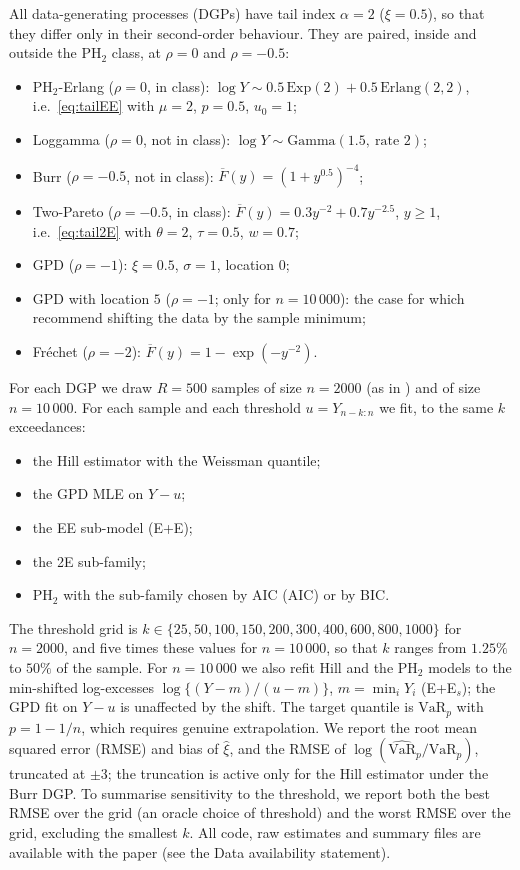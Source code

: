 \documentclass[12pt]{article}
\theoremstyle{definition}
\theoremstyle{remark}
\newcommand{\bF}{\overline{F}}
\newcommand{\VaR}{\mathrm{VaR}}
\begin{document}
All data-generating processes (DGPs) have tail index $\alpha=2$ ($\xi=0.5$), so that they differ only in their second-order behaviour. They are paired, inside and outside the PH$_2$ class, at $\rho=0$ and $\rho=-0.5$:
\begin{itemize}
\item PH$_2$-Erlang ($\rho=0$, in class): $\log Y\sim 0.5\,\mathrm{Exp}(2)+0.5\,\mathrm{Erlang}(2,2)$, i.e.\ \eqref{eq:tailEE} with $\mu=2$, $p=0.5$, $u_0=1$;
\item Loggamma ($\rho=0$, not in class): $\log Y\sim\mathrm{Gamma}(1.5,\ \text{rate } 2)$;
\item Burr ($\rho=-0.5$, not in class): $\bF(y)=(1+y^{0.5})^{-4}$;
\item Two-Pareto ($\rho=-0.5$, in class): $\bF(y)=0.3y^{-2}+0.7y^{-2.5}$, $y\ge1$, i.e.\ \eqref{eq:tail2E} with $\theta=2$, $\tau=0.5$, $w=0.7$;
\item GPD ($\rho=-1$): $\xi=0.5$, $\sigma=1$, location $0$;
\item GPD with location $5$ ($\rho=-1$; only for $n=10\,000$): the case for which \citet{KimKim2015} recommend shifting the data by the sample minimum;
\item Fr\'echet ($\rho=-2$): $\bF(y)=1-\exp(-y^{-2})$.
\end{itemize}
For each DGP we draw $R=500$ samples of size $n=2000$ (as in \citet{KimKim2015}) and of size $n=10\,000$. For each sample and each threshold $u=Y_{n-k:n}$ we fit, to the same $k$ exceedances:
\begin{itemize}
\item the Hill estimator with the Weissman quantile;
\item the GPD MLE on $Y-u$;
\item the EE sub-model (E+E);
\item the 2E sub-family;
\item PH$_2$ with the sub-family chosen by AIC (AIC) or by BIC.
\end{itemize}
The threshold grid is $k\in\{25,50,100,150,200,300,400,600,800,1000\}$ for $n=2000$, and five times these values for $n=10\,000$, so that $k$ ranges from $1.25\%$ to $50\%$ of the sample. For $n=10\,000$ we also refit Hill and the PH$_2$ models to the min-shifted log-excesses $\log\{(Y-m)/(u-m)\}$, $m=\min_iY_i$ (E+E$_s$); the GPD fit on $Y-u$ is unaffected by the shift. The target quantile is $\VaR_p$ with $p=1-1/n$, which requires genuine extrapolation. We report the root mean squared error (RMSE) and bias of $\hat\xi$, and the RMSE of $\log(\widehat{\VaR}_p/\VaR_p)$, truncated at $\pm3$; the truncation is active only for the Hill estimator under the Burr DGP. To summarise sensitivity to the threshold, we report both the best RMSE over the grid (an oracle choice of threshold) and the worst RMSE over the grid, excluding the smallest $k$. All code, raw estimates and summary files are available with the paper (see the Data availability statement).
\end{document}
